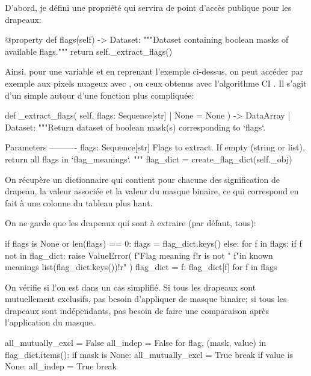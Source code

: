D'abord, je défini une propriété qui servira de point d'accès publique pour les drapeaux:
\begin{python}
@property
def flags(self) -> Dataset:
    """Dataset containing boolean masks of available flags."""
    return self._extract_flags()
\end{python}
Ainsi, pour une variable  et en reprenant l'exemple ci-dessus, on peut accéder par exemple aux pixels nuageux avec , ou ceux obtenus avec l'algorithme CI .
Il s'agit d'un simple  autour d'une fonction plus compliquée:
\begin{pythonFirst}
def _extract_flags(
        self, flags: Sequence[str] | None = None
) -> DataArray | Dataset:
    """Return dataset of boolean mask(s) corresponding to `flags`.

    Parameters
    ----------
    flags: Sequence[str]
        Flags to extract. If empty (string or list),
        return all flags in `flag_meanings`.
    """
    flag_dict = create_flag_dict(self._obj)
\end{pythonFirst}
On récupère un dictionnaire qui contient pour chacune des signification de drapeau, la valeur associée et la valeur du masque binaire, ce qui correspond en fait à une colonne du tableau plus haut.

On ne garde que les drapeaux qui sont à extraire (par défaut, tous):
\begin{pythonMiddle}[]
    if flags is None or len(flags) == 0:
        flags = flag_dict.keys()
    else:
        for f in flags:
            if f not in flag_dict:
                raise ValueError(
                    f"Flag meaning {f!r} is not "
                    f"in known meanings {list(flag_dict.keys())!r}"
                )
        flag_dict = {f: flag_dict[f] for f in flags}
\end{pythonMiddle}

On vérifie si l'on est dans un cas simplifié. Si tous les drapeaux sont mutuellement exclusifs, pas besoin d'appliquer de masque binaire; si tous les drapeaux sont indépendants, pas besoin de faire une comparaison après l'application du masque.
\begin{pythonMiddle}[]
    all_mutually_excl = False
    all_indep = False
    for flag, (mask, value) in flag_dict.items():
        if mask is None:
            all_mutually_excl = True
            break
        if value is None:
            all_indep = True
            break
\end{pythonMiddle}

